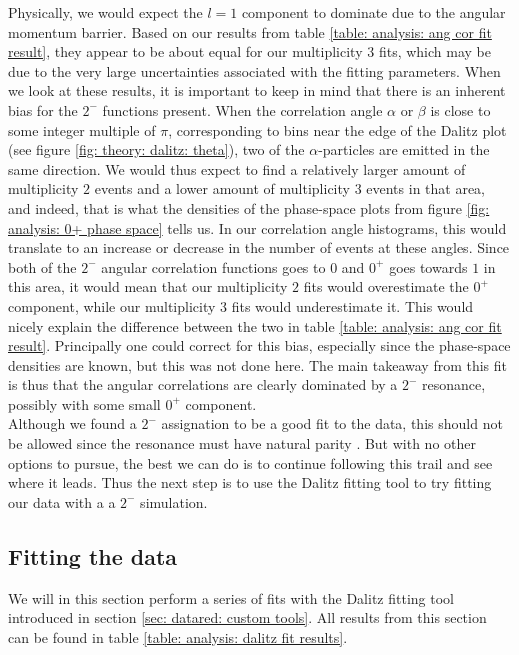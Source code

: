 Physically, we would expect the $l=1$ component to dominate due to the angular momentum barrier. Based on our results from table \ref{table: analysis: ang cor fit result}, they appear to be about equal for our multiplicity $3$ fits, which may be due to the very large uncertainties associated with the fitting parameters. When we look at these results, it is important to keep in mind that there is an inherent bias for the $2^-$ functions present. When the correlation angle $\alpha$ or $\beta$ is close to some integer multiple of $\pi$, corresponding to bins near the edge of the Dalitz plot (see figure \ref{fig: theory: dalitz: theta}), two of the $\alpha$-particles are emitted in the same direction. We would thus expect to find a relatively larger amount of multiplicity $2$ events and a lower amount of multiplicity $3$ events in that area, and indeed, that is what the densities of the phase-space plots from figure \ref{fig: analysis: 0+ phase space} tells us. In our correlation angle histograms, this would translate to an increase or decrease in the number of events at these angles. Since both of the $2^-$ angular correlation functions goes to $0$ and $0^+$ goes towards $1$ in this area, it would mean that our multiplicity $2$ fits would overestimate the $0^+$ component, while our multiplicity $3$ fits would underestimate it. This would nicely explain the difference between the two in table \ref{table: analysis: ang cor fit result}. Principally one could correct for this bias, especially since the phase-space densities are known, but this was not done here. The main takeaway from this fit is thus that the angular correlations are clearly dominated by a $2^-$ resonance, possibly with some small $0^+$ component. \\

Although we found a $2^-$ assignation to be a good fit to the data, this should not be allowed since the resonance must have natural parity \cite{Symons}\cite{Segel}\cite{Munch}. But with no other options to pursue, the best we can do is to continue following this trail and see where it leads. Thus the next step is to use the Dalitz fitting tool to try fitting our data with a a $2^-$ simulation.

\FloatBarrier

\subsection{Fitting the data}
We will in this section perform a series of fits with the Dalitz fitting tool introduced in section \ref{sec: datared: custom tools}. All results from this section can be found in table \ref{table: analysis: dalitz fit results}. 

